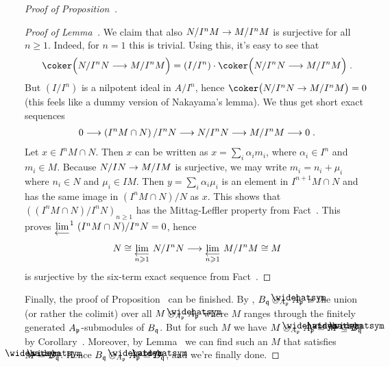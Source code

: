 \documentclass[a4paper,parskip=half,numbers=enddot, DIV=12]{scrreprt}
\renewcommand{\geq}{\geqslant}
\begin{document}
\begin{proof}[Proof of Proposition~]
\begin{proof}[Proof of Lemma~]
		We claim that also $N/I^nM\morphism M/I^nM$ is surjective for all $n\geq 1$. Indeed, for $n=1$ this is trivial. Using this, it's easy to see that
		\begin{align*}
		\coker\Big(N/I^nN\morphism M/I^nM\Big)=(I/I^n)\cdot\coker\Big(N/I^nN\morphism M/I^nM\Big)\;.
		\end{align*}
		But $(I/I^n)$ is a nilpotent ideal in $A/I^n$, hence $\coker\big(N/I^nN\morphism M/I^nM\big)=0$ (this feels like a dummy version of Nakayama's lemma). We thus get short exact sequences
		\begin{align*}
		0\morphism\left(I^nM\cap N\right)/I^nN\morphism N/I^nN\morphism M/I^nM\morphism 0\;.
		\end{align*}
		Let $x\in I^nM\cap N$. Then $x$ can be written as $x=\sum_i\alpha_i m_i$, where $\alpha_i\in I^n$ and $m_i\in M$. Because $N/IN\morphism M/IM$ is surjective, we may write $m_i=n_i+\mu_i$ where $n_i\in N$ and $\mu_i\in IM$. Then $y=\sum_i\alpha_i\mu_i$ is an element in $I^{n+1}M\cap N$ and has the same image in $(I^nM\cap N)/N$ as $x$. This shows that $\left((I^nM\cap N)/I^nN\right)_{n\geq 1}$ has the Mittag-Leffler property from Fact~. This proves $\limit[][^1](I^nM\cap N)/I^nN=0$, hence 
		\begin{align*}
		N\cong \limit[n\geq 1]N/I^nN\morphism \limit[n\geq 1]M/I^nM\cong M
		\end{align*}
		is surjective by the six-term exact sequence from Fact~.
	\end{proof}
	Finally, the proof of Proposition~ can be finished. By \cite[p.~18]{homalg}, $B_\qq\otimes_{A_\pp}\roof{A}_\pp$ is the union (or rather the colimit) over all $M\otimes_{A_\pp}\roof{A}_\pp$ where $M$ ranges through the finitely generated $A_{\mathfrak{p}}$-submodules of $B_{\mathfrak{q}}$. But for such $M$ we have $M\otimes_{A_\pp}\roof{A}_\pp\cong \roof{M}\subseteq \roof{B}_\qq$ by Corollary~. Moreover, by Lemma~ we can find such an $M$ that satisfies $\roof{M}=\roof{B}_\qq$. Hence $B_\qq\otimes_{A_\pp}\roof{A}_\pp\cong \roof{B}_\qq$, and we're finally done.
\end{proof}
\end{document}
